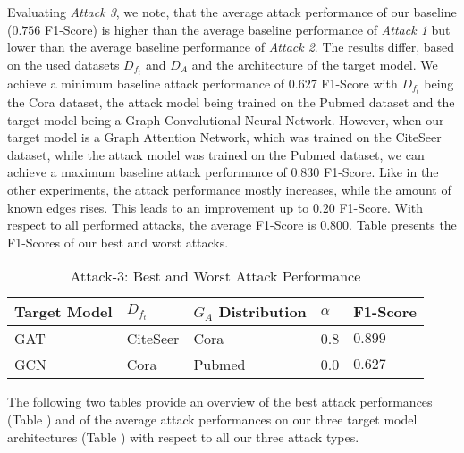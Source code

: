             Evaluating \emph{Attack 3}, we note, that the average attack performance of our baseline ($0.756$ F1-Score) is higher than the average baseline performance of \emph{Attack 1} but lower than the average baseline performance of \emph{Attack 2}.
            The results differ, based on the used datasets $D_{f_t}$ and $D_A$ and the architecture of the target model.
            We achieve a minimum baseline attack performance of $0.627$ F1-Score with $D_{f_t}$ being the Cora dataset, the attack model being trained on the Pubmed dataset and the target model being a Graph Convolutional Neural Network.
            However, when our target model is a Graph Attention Network, which was trained on the CiteSeer dataset, while the attack model was trained on the Pubmed dataset, we can achieve a maximum baseline attack performance of $0.830$ F1-Score.  
            Like in the other experiments, the attack performance mostly increases, while the amount of known edges rises.
            This leads to an improvement up to $0.20$ F1-Score.
            With respect to all performed attacks, the average F1-Score is $0.800$.
            Table  presents the F1-Scores of our best and worst attacks.
            
            \vspace{0.48cm}
            \begin{table}[!h]
                \centering
                \footnotesize
                \begin{tabular}{l|l|l|l|l|}
                \toprule
                Target Model & $D_{f_t}$ & $G_A$ Distribution & $\alpha$ & F1-Score \\
                \midrule 
                GAT & CiteSeer & Cora   & 0.8 & $0.899$ \\
                GCN & Cora     & Pubmed & 0.0 & $0.627$ \\
                
                \bottomrule
                \end{tabular}
                \caption{Attack-3: Best and Worst Attack Performance}
                \label{table:attack3-best-and-worst-performance}
            \end{table}
        
        The following two tables provide an overview of the best attack performances (Table ) and of the average attack performances on our three target model architectures (Table ) with respect to all our three attack types.

